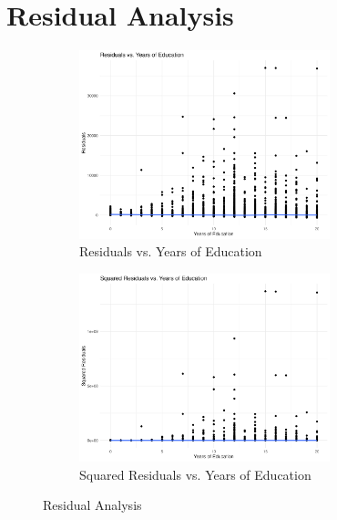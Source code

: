 \documentclass[12pt]{article}
\begin{document}
\section{Residual Analysis}
\begin{figure}[h]
    \begin{subfigure}{0.48\textwidth}
    \centering
    \includegraphics[width=0.8\textwidth]{output/residuals_vs_educ.png}
    \caption{\label{fig:residuals_vs_educ}Residuals vs. Years of Education}
    \end{subfigure}
    \begin{subfigure}{0.48\textwidth}
    \centering
    \includegraphics[width=0.8\textwidth]{output/squared_residuals_vs_educ.png}
    \caption{\label{fig:squared_residuals_vs_educ}Squared Residuals vs. Years of Education}
    \end{subfigure}
    \caption{\label{fig:residual_analysis}Residual Analysis}
\end{figure}
\end{document}
